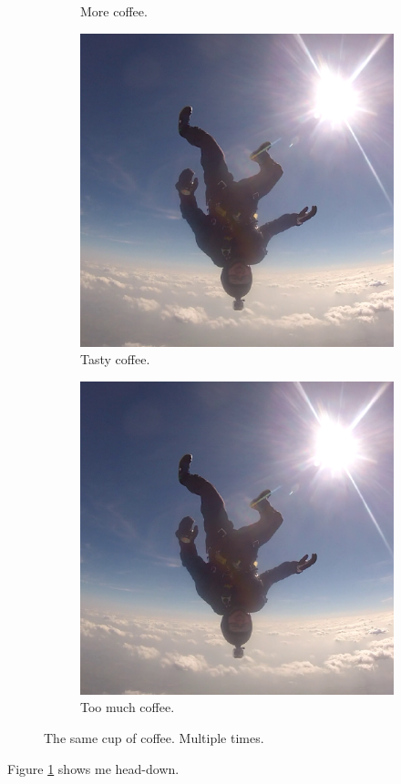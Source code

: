 \documentclass{article}
\begin{document}
\begin{figure}[h!]
\begin{subfigure}[b]{0.2\linewidth}
    \caption{More coffee.}
  \end{subfigure}
  \begin{subfigure}[b]{0.2\linewidth}
    \includegraphics[width=\linewidth]{head-down.png}
    \caption{Tasty coffee.}
  \end{subfigure}
  \begin{subfigure}[b]{0.5\linewidth}
    \includegraphics[width=\linewidth]{head-down.png}
    \caption{Too much coffee.}
  \end{subfigure}
  \caption{The same cup of coffee. Multiple times.}
  \label{fig:coffee3}
\end{figure}

Figure \ref{fig:coffee3} shows me head-down.
\end{document}
